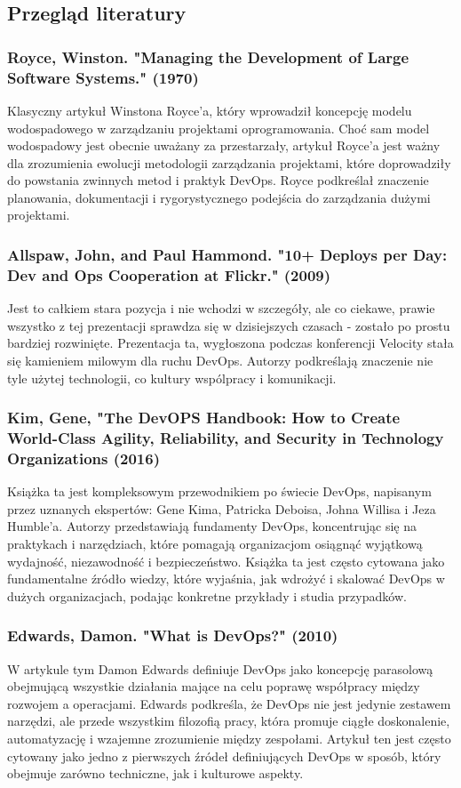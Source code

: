 \documentclass{article}
\begin{document}
\subsection{Przegląd literatury}

\subsubsection{Royce, Winston. "Managing the Development of Large Software Systems." (1970)}
Klasyczny artykuł Winstona Royce'a, który wprowadził koncepcję modelu wodospadowego w zarządzaniu projektami oprogramowania. Choć sam model wodospadowy jest obecnie uważany za przestarzały, artykuł Royce'a jest ważny dla zrozumienia ewolucji metodologii zarządzania projektami, które doprowadziły do powstania zwinnych metod i praktyk DevOps. Royce podkreślał znaczenie planowania, dokumentacji i rygorystycznego podejścia do zarządzania dużymi projektami.

\subsubsection{Allspaw, John, and Paul Hammond. "10+ Deploys per Day: Dev and Ops Cooperation at Flickr." (2009)
}
Jest to całkiem stara pozycja i nie wchodzi w szczegóły, ale co ciekawe, prawie wszystko z tej prezentacji sprawdza się w dzisiejszych czasach - zostało po prostu bardziej rozwinięte. Prezentacja ta, wygłoszona podczas konferencji Velocity stała się kamieniem milowym dla ruchu DevOps. Autorzy podkreślają znaczenie nie tyle użytej technologii, co kultury wspólpracy i komunikacji. 

\subsubsection{Kim, Gene, "The DevOPS Handbook: How to Create World-Class Agility, Reliability, and Security in Technology Organizations (2016)
}
Książka ta jest kompleksowym przewodnikiem po świecie DevOps, napisanym przez uznanych ekspertów: Gene Kima, Patricka Deboisa, Johna Willisa i Jeza Humble'a. Autorzy przedstawiają fundamenty DevOps, koncentrując się na praktykach i narzędziach, które pomagają organizacjom osiągnąć wyjątkową wydajność, niezawodność i bezpieczeństwo. Książka ta jest często cytowana jako fundamentalne źródło wiedzy, które wyjaśnia, jak wdrożyć i skalować DevOps w dużych organizacjach, podając konkretne przykłady i studia przypadków.

\subsubsection{
Edwards, Damon. "What is DevOps?" (2010)
}
W artykule tym Damon Edwards definiuje DevOps jako koncepcję parasolową obejmującą wszystkie działania mające na celu poprawę współpracy między rozwojem a operacjami. Edwards podkreśla, że DevOps nie jest jedynie zestawem narzędzi, ale przede wszystkim filozofią pracy, która promuje ciągłe doskonalenie, automatyzację i wzajemne zrozumienie między zespołami. Artykuł ten jest często cytowany jako jedno z pierwszych źródeł definiujących DevOps w sposób, który obejmuje zarówno techniczne, jak i kulturowe aspekty.
\end{document}
